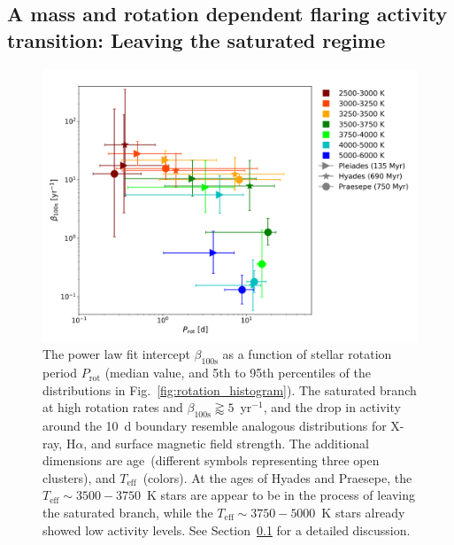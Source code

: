 \documentclass{aa}
\begin{document}
\subsection{A mass and rotation dependent flaring activity transition: Leaving the saturated regime}
\label{sec:4dim}
\begin{figure}[ht!]
    \centering
    \includegraphics[width=\hsize]{pics/FFDs/beta_T_age_rotation_full.png}
    \caption{The power law fit intercept $\beta_\mathrm{100s}$ as a function of stellar rotation period $P_\mathrm{rot}$ (median value, and 5th to 95th percentiles of the distributions in Fig.~\ref{fig:rotation_histogram}). The saturated branch at high rotation rates and $\beta_\mathrm{100s}\gtrapprox 5$~yr$^{-1}$, and the drop in activity around the 10~d boundary resemble analogous distributions for X-ray, H$\alpha$, and surface magnetic field strength. The additional dimensions are age~(different symbols representing three open clusters), and $T_\mathrm{eff}$~(colors). At the ages of Hyades and Praesepe, the $T_\mathrm{eff}\sim 3500-3750$~K stars are appear to be in the process of leaving the saturated branch, while the $T_\mathrm{eff}\sim 3750-5000$~K stars already showed low activity levels. See Section~\ref{sec:4dim} for a detailed discussion.}       
    \label{fig:4dim}
\end{figure}
\end{document}
